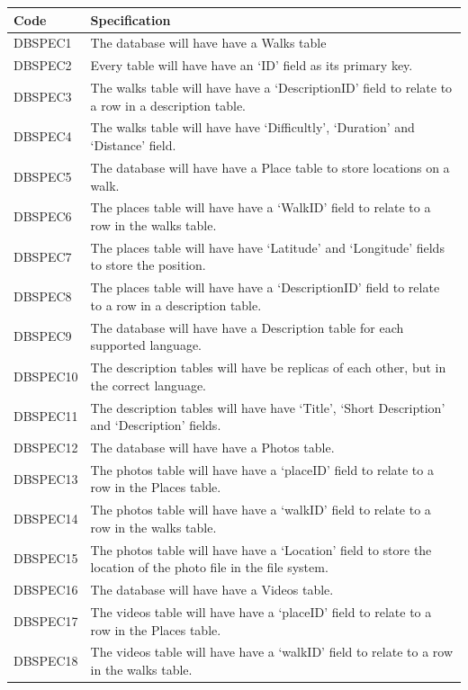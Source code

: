 \documentclass[11pt,a4paper]{article}
\begin{document}
\begin{longtable}{|p{2.5cm}p{13cm}|}
\hline
\textbf{Code} & \textbf{Specification} \\
\hline
DBSPEC1 & The database will have have a Walks table\\ \hline
DBSPEC2 & Every table will have have an `ID' field as its primary key.\\ \hline
DBSPEC3 & The walks table will have have a `DescriptionID' field to relate to a row in a description table. \\ \hline
DBSPEC4 & The walks table will have have `Difficultly',  `Duration' and `Distance' field. \\ \hline
DBSPEC5 & The database will have have a Place table to store locations on a walk.\\ \hline
DBSPEC6 & The places table will have have a `WalkID' field to relate to a row in the walks table.\\ \hline
DBSPEC7 & The places table will have have `Latitude' and `Longitude'  fields to store the position. \\ \hline
DBSPEC8 & The places table will have have a `DescriptionID' field to relate to a row in a description table. \\ \hline
DBSPEC9 & The database will have have a Description table for each supported language. \\ \hline
DBSPEC10 & The description tables will have be replicas of each other, but in the correct language. \\ \hline
DBSPEC11 & The description tables will have have `Title', `Short Description' and `Description' fields.\\ \hline
DBSPEC12 & The database will have have a Photos table.\\ \hline
DBSPEC13 & The photos table will have have a `placeID' field to relate to a row in the Places table. \\ \hline
DBSPEC14 & The photos table will have have a `walkID' field to relate to a row in the walks table.\\ \hline
DBSPEC15 & The photos table will have have a `Location' field to store the location of the photo file in the file system.\\ \hline
DBSPEC16 & The database will have have a Videos table. \\ \hline
DBSPEC17 & The videos table will have have a `placeID' field to relate to a row in the Places table. \\ \hline
DBSPEC18 & The videos table will have have a `walkID' field to relate to a row in the walks table.\\ \hline

\end{longtable}
\end{document}
